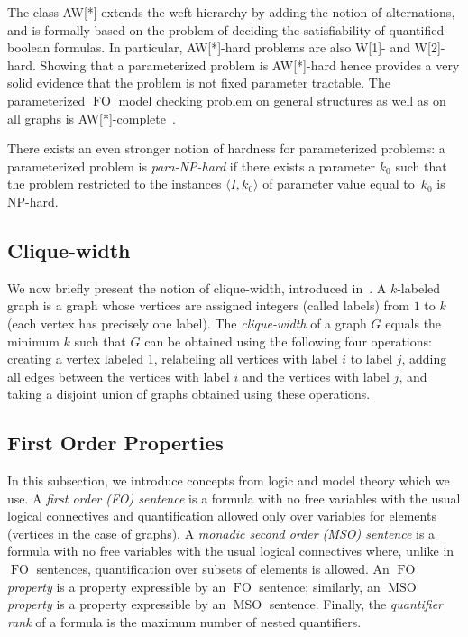 \documentclass{CSML}
\newcommand{\FO}{\ensuremath{\operatorname{FO}}\xspace}
\newcommand{\MSO}{\ensuremath{\operatorname{MSO}}\xspace}
\theoremstyle{plain}\newtheorem{claim}[thm]{Claim}
\begin{document}
The class AW[*] extends the weft hierarchy by adding the notion of
alternations, and is formally based on the problem of deciding the
satisfiability of quantified boolean formulas. 
In particular, AW[*]-hard problems are also W[1]- and W[2]-hard.
Showing that a parameterized problem is AW[*]-hard hence provides
a very solid evidence that the problem is not fixed parameter tractable.
The parameterized \FO model checking problem on general structures 
as well as on all graphs is AW[*]-complete~\cite{dft96}.

There exists an even stronger notion of hardness for parameterized
problems: a parameterized problem is \emph{para-\textup{NP}-hard}
if there exists a parameter $k_0$ such that the problem restricted to
the instances $\langle I,k_0\rangle$ of parameter value equal to~$k_0$ is NP-hard.

\subsection{Clique-width}

We now briefly present the notion of clique-width, introduced in~\cite{co00}.
A $k$-labeled graph is a graph whose vertices are assigned integers (called
labels) from $1$ to $k$ (each vertex has precisely one label).  The {\em
  clique-width} of a graph $G$ equals the minimum $k$ such that $G$ can be
obtained using the following four operations: creating a vertex labeled 
$1$, relabeling all vertices with label $i$ to label $j$, adding all edges between
the vertices with label $i$ and the vertices with label $j$, and
taking a disjoint union of graphs obtained using these operations.

\subsection{First Order Properties}

In this subsection,
we introduce concepts from logic and model theory which we use. A {\em first order (FO) sentence}
is a formula with no free variables with the usual logical connectives and quantification allowed only
over variables for elements (vertices in the case of graphs).
A {\em monadic second order (MSO) sentence}
is a formula with no free variables with the usual logical connectives where, unlike in \FO sentences, quantification over subsets
of elements is allowed. An {\em \FO property} is a property expressible by an \FO sentence; similarly,
an {\em \MSO property} is a property expressible by an \MSO sentence.
Finally, the {\em quantifier rank} of a formula is the maximum number of nested quantifiers.
\end{document}
